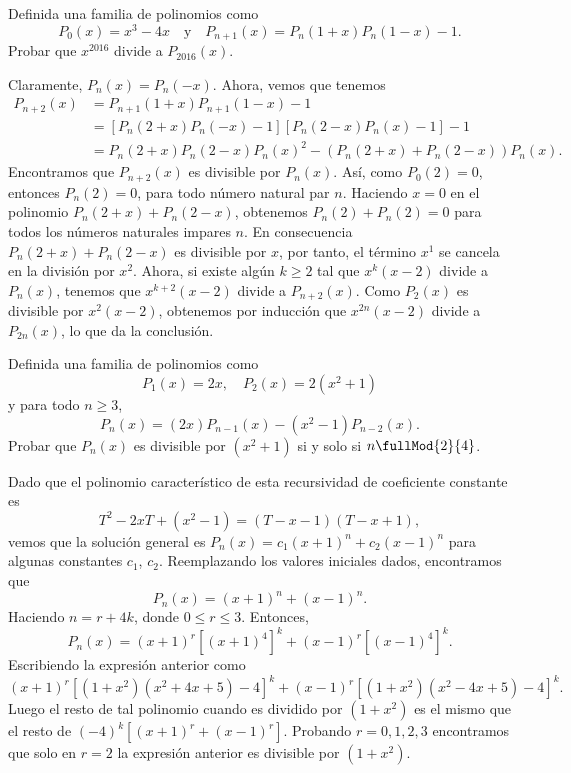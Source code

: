 \begin{example}
    Definida una familia de polinomios como
    \[
        P_0(x) = x^3 - 4x \quad\text{y}\quad P_{n + 1}(x) = P_n(1 + x)P_n(1 - x) - 1.
    \]
    Probar que $x^{2016}$ divide a $P_{2016}(x)$.
\end{example}
\begin{solution}
    Claramente, $P_n(x) = P_n(-x)$.
    Ahora, vemos que tenemos
    \begin{align*}
        P_{n + 2}(x) &= P_{n + 1}(1 + x)P_{n + 1}(1 - x) - 1\\
        &= \left[P_n(2 + x)P_n(-x) - 1\right]\left[P_n(2 - x)P_n(x) - 1\right] - 1\\
        &= P_n(2 + x)P_n(2 - x)P_n(x)^2 - \left(P_n(2 + x) + P_n(2 - x)\right)P_n(x).
    \end{align*}
    Encontramos que $P_{n + 2}(x)$ es divisible por $P_n(x)$.
    Así, como $P_0(2) = 0$, entonces $P_n(2) = 0$, para todo número natural par $n$.
    Haciendo $x = 0$ en el polinomio $P_n(2 + x) + P_n(2 - x)$, obtenemos $P_n(2) + P_n(2) = 0$ para todos los números naturales impares $n$.
    En consecuencia $P_n(2 + x) + P_n(2 - x)$ es divisible por $x$, por tanto, el término $x^1$ se cancela en la división por $x^2$.
    Ahora, si existe algún $k \geq 2$ tal que $x^k(x - 2)$ divide a $P_n(x)$, tenemos que $x^{k + 2}(x - 2)$ divide a $P_{n + 2}(x)$.
    Como $P_2(x)$ es divisible por $x^2(x - 2)$, obtenemos por inducción que $x^{2n}(x - 2)$ divide a $P_{2n}(x)$, lo que da la conclusión.
\end{solution}

\begin{example}
    Definida una familia de polinomios como
    \[
        P_1(x) = 2x, \quad P_2(x) = 2(x^2 + 1)
    \]
    y para todo $n \geq 3$,
    \[
        P_n(x) = (2x)P_{n - 1}(x) - (x^2 - 1)P_{n - 2}(x).
    \]
    Probar que $P_n(x)$ es divisible por $(x^2 + 1)$ si y solo si $n \fullMod{2}{4}$.
\end{example}
\begin{solution}
    Dado que el polinomio característico de esta recursividad de coeficiente constante es
    \[
        T^2 - 2x T + (x^2 - 1) = (T - x - 1)(T - x + 1),
    \]
    vemos que la solución general es $P_n(x) = c_1 (x + 1)^n + c_2 (x - 1)^n$ para algunas constantes $c_1$, $c_2$.
    Reemplazando los valores iniciales dados, encontramos que
    \[
        P_n(x) = (x + 1)^n + (x - 1)^n.
    \]
    Haciendo $n = r + 4k$, donde $0 \leq r \leq 3$.
    Entonces,
    \[
        P_n(x) = (x + 1)^r [(x + 1)^4]^k + (x - 1)^r [(x - 1)^4]^k.
    \]
    Escribiendo la expresión anterior como
    \[
        (x + 1)^r [(1 + x^2)(x^2 + 4x + 5) - 4]^k + (x - 1)^r [(1 + x^2)(x^2 - 4x + 5) - 4]^k.
    \]
    Luego el resto de tal polinomio cuando es dividido por $(1 + x^2)$ es el mismo que el resto de $(-4)^k[(x + 1)^r + (x - 1)^r]$.
    Probando $r = 0, 1, 2, 3$ encontramos que solo en $r = 2$ la expresión anterior es divisible por $(1 + x^2)$.
\end{solution}



